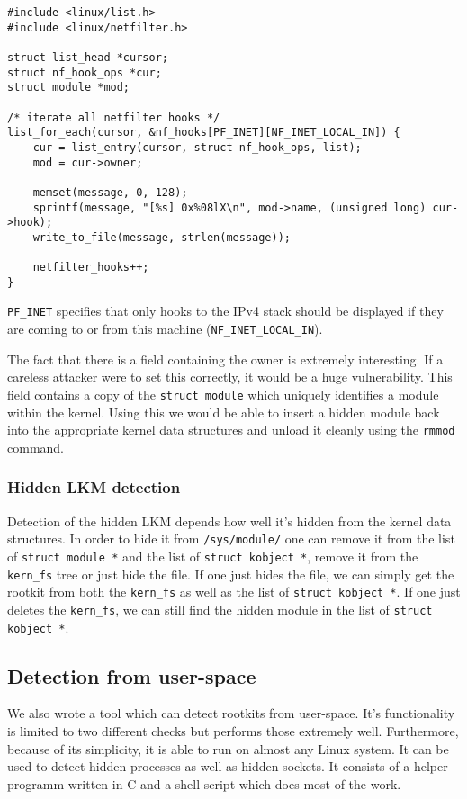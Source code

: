 \documentclass[10pt, letterpaper]{scrartcl}
\begin{document}
\begin{lstlisting}
#include <linux/list.h>
#include <linux/netfilter.h>

struct list_head *cursor;
struct nf_hook_ops *cur;
struct module *mod;

/* iterate all netfilter hooks */
list_for_each(cursor, &nf_hooks[PF_INET][NF_INET_LOCAL_IN]) {
	cur = list_entry(cursor, struct nf_hook_ops, list);
	mod = cur->owner;
	
	memset(message, 0, 128);
	sprintf(message, "[%s] 0x%08lX\n", mod->name, (unsigned long) cur->hook);
	write_to_file(message, strlen(message));
	
	netfilter_hooks++;
}
\end{lstlisting}

\texttt{PF\_INET} specifies that only hooks to the IPv4 stack should be displayed if they are coming to or from this machine (\texttt{NF\_INET\_LOCAL\_IN}).

The fact that there is a field containing the owner is extremely interesting.
If a careless attacker were to set this correctly, it would be a huge vulnerability.
This field contains a copy of the \texttt{struct module} which uniquely identifies a module within the kernel.
Using this we would be able to insert a hidden module back into the appropriate kernel data structures and unload it cleanly using the \texttt{rmmod} command.

\subsubsection{Hidden LKM detection}
Detection of the hidden LKM depends how well it's hidden from the kernel data structures. 
In order to hide it from \texttt{/sys/module/} one can remove it from the list of  \texttt{struct module *} and the list of \texttt{struct kobject *}, remove it from the \texttt{kern\_fs} tree or just hide the file. 
If one just hides the file, we can simply get the rootkit from both the \texttt{kern\_fs} as well as the list of \texttt{struct kobject *}. 
If one just deletes the \texttt{kern\_fs}, we can still find the hidden module in the list of \texttt{struct kobject *}. 


\subsection{Detection from user-space}\label{sec:script}
We also wrote a tool which can detect rootkits from user-space.
It's functionality is limited to two different checks but performs those extremely well.
Furthermore, because of its simplicity, it is able to run on almost any Linux system.
It can be used to detect hidden processes as well as hidden sockets.
It consists of a helper programm written in C and a shell script which does most of the work.
\end{document}

